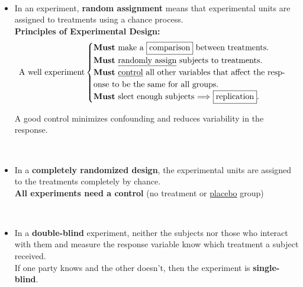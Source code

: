 \documentclass[Main.tex]{subfiles}
\begin{document}
	\begin{exercise} \hfill \\
		\begin{itemize}
			\item In an experiment, \textbf{random assignment} means that experimental units are assigned to treatments using a chance process.\hfill \\

			\textbf{Principles of Experimental Design:}			
			\begin{subequations}			
				\begin{align}
				\text{A well experiment}				
				\begin{cases}
				\text{\textbf{Must} make a \fbox{comparison} between treatments.}\\
				\text{\textbf{Must} \underline{randomly assign} subjects to treatments.}\\				
				\text{\textbf{Must} \underline{control} all other variables that affect the resp-}\\ \text{onse to be the same for all groups.}\\
				\text{\textbf{Must} slect enough subjects $\Longrightarrow$ \fbox{replication}.}\\
				\end{cases}
				\end{align}
			\end{subequations}
			
			A good control minimizes confounding and reduces variability in the response.
		\end{itemize}
	\end{exercise}	
	
	\begin{exercise} \hfill \\
		\begin{itemize}	
			\item In a \textbf{completely randomized design}, the experimental units are assigned to the treatments completely by chance.\\
			\textbf{All experiments need a control} (no treatment or \underline{placebo} group)
		\end{itemize}
	\end{exercise}	
			
	\begin{exercise} \hfill \\
		\begin{itemize}					
			\item In a \textbf{double-blind} experiment, neither the subjects nor those who interact with them and measure the response variable know which treatment a subject received.\\
			If one party knows and the other doesn't, then the experiment is \textbf{single-blind}.
		\end{itemize}
	\end{exercise}	
	
\end{document}
